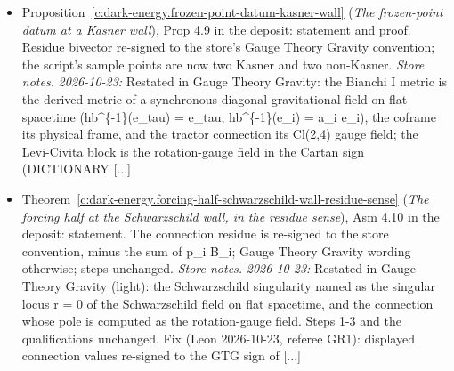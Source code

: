\documentclass[11pt]{article}
\theoremstyle{definition}
\theoremstyle{plain}
\begin{document}
\begin{itemize}
\item Proposition~\ref{c:dark-energy.frozen-point-datum-kasner-wall} (\emph{The frozen-point datum at a Kasner wall}), Prop 4.9 in the deposit: statement and proof. Residue bivector re-signed to the store's Gauge Theory Gravity convention; the script's sample points are now two Kasner and two non-Kasner. \emph{Store notes.} \emph{2026-10-23:} Restated in Gauge Theory Gravity: the Bianchi I metric is the derived metric of a synchronous diagonal gravitational field on flat spacetime (hb\^{}\{-1\}(e\_tau) = e\_tau, hb\^{}\{-1\}(e\_i) = a\_i e\_i), the coframe its physical frame, and the tractor connection its Cl(2,4) gauge field; the Levi-Civita block is the rotation-gauge field in the Cartan sign (DICTIONARY [...]
\item Theorem~\ref{c:dark-energy.forcing-half-schwarzschild-wall-residue-sense} (\emph{The forcing half at the Schwarzschild wall, in the residue sense}), Asm 4.10 in the deposit: statement. The connection residue is re-signed to the store convention, minus the sum of p\_i B\_i; Gauge Theory Gravity wording otherwise; steps unchanged. \emph{Store notes.} \emph{2026-10-23:} Restated in Gauge Theory Gravity (light): the Schwarzschild singularity named as the singular locus r = 0 of the Schwarzschild field on flat spacetime, and the connection whose pole is computed as the rotation-gauge field. Steps 1-3 and the qualifications unchanged. Fix (Leon 2026-10-23, referee GR1): displayed connection values re-signed to the GTG sign of [...]
\end{itemize}
\end{document}
